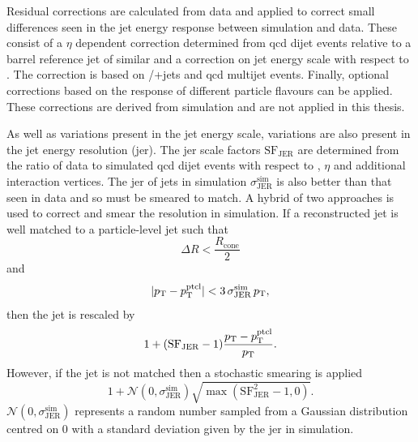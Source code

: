 Residual corrections are calculated from data and applied to correct small differences seen in the jet energy response between simulation and data.
These consist of a $\eta$ dependent correction determined from \acrshort{qcd} dijet events relative to a barrel reference jet of similar \pt{} and a correction on jet energy scale with respect to \pt{}.
The \pt{} correction is based on \Zboson/\photon{}+jets and \acrshort{qcd} multijet events. 
Finally, optional corrections based on the response of different particle flavours can be applied.
These corrections are derived from simulation and are not applied in this thesis.

As well as variations present in the jet energy scale, variations are also present in the jet energy resolution (\acrshort{jer}).
The \acrshort{jer} scale factors $\mathrm{SF}_{\mathrm{JER}}$ are determined from the ratio of data to simulated \acrshort{qcd} dijet events with respect to \pt{}, $\eta$ and additional interaction vertices.
The \acrshort{jer} of jets in simulation $\sigma_\mathrm{JER}^{\mathrm{sim}}$ is also better than that seen in data and so must be smeared to match.
A hybrid of two approaches is used to correct and smear the resolution in simulation.
If a reconstructed jet is well matched to a particle-level jet such that 
\begin{equation*}
	\Delta R < \frac{R_\mathrm{cone}}{2}
\end{equation*}
and 
\begin{equation}
	\lvert p_{\mathrm{T}} - p_{\mathrm{T}}^\mathrm{ptcl} \rvert < 3\,\sigma_\mathrm{JER}^{\mathrm{sim}}\,p_{\mathrm{T}},
\end{equation}
 then the jet \pt{} is rescaled by
\begin{equation*}
	1+(\mathrm{SF}_{\mathrm{JER}}-1)\frac{p_{\mathrm{T}}-p_{\mathrm{T}}^{\mathrm{ptcl}}}{p_{\mathrm{T}}}.
\end{equation*}
However, if the jet is not matched then a stochastic smearing is applied
\begin{equation*}
	1 + \mathcal{N}(0,\sigma_\mathrm{JER}^{\mathrm{sim}}) \sqrt{\max(\mathrm{SF}_{\mathrm{JER}}^2 - 1, 0)}.
\end{equation*}
$\mathcal N(0,\sigma_\mathrm{JER}^{\mathrm{sim}})$ represents a random number sampled from a Gaussian distribution centred on 0 with a standard deviation given by the \acrshort{jer} in simulation.


